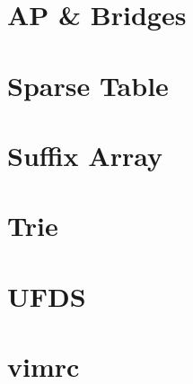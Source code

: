 \documentclass[twocolumn]{article}
\begin{document}
{    \section{AP \& Bridges}
    
    \section{Sparse Table}
    
    \section{Suffix Array}
    
    \section{Trie}
    
    \section{UFDS}
    
    \section{vimrc}
    
}
\end{document}
